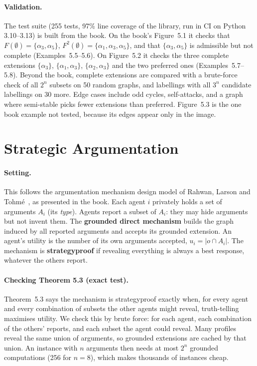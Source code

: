 \documentclass[11pt,a4paper]{article}
\newcommand{\A}[1]{\alpha_{#1}}
\begin{document}
\paragraph{Validation.} The test suite (255 tests, 97\% line coverage of the
library, run in CI on Python 3.10--3.13) is built from the book. On the
book's Figure~5.1 it checks that $F(\emptyset) = \{\A3,\A5\}$,
$F^2(\emptyset) = \{\A1,\A3,\A5\}$, and that $\{\A3,\A5\}$ is admissible but
not complete (Examples~5.5--5.6). On Figure~5.2 it checks the three complete
extensions $\{\A3\}$, $\{\A1,\A3\}$, $\{\A2,\A3\}$ and the two preferred ones
(Examples~5.7--5.8). Beyond the book, complete extensions are compared with a
brute-force check of all $2^n$ subsets on 50 random graphs, and labellings
with all $3^n$ candidate labellings on 30 more. Edge cases include odd
cycles, self-attacks, and a graph where semi-stable picks fewer extensions
than preferred. Figure~5.3 is the one book example not tested, because its
edges appear only in the image.

\section{Strategic Argumentation}

\paragraph{Setting.} This follows the argumentation mechanism design model
of Rahwan, Larson and Tohm\'e~\cite{rlt}, as presented in the book. Each agent $i$ privately holds a set of arguments $A_i$
(its \emph{type}). Agents report a subset of $A_i$: they may hide arguments
but not invent them. The \textbf{grounded direct mechanism} builds the graph
induced by all reported arguments and accepts its grounded extension. An
agent's utility is the number of its own arguments accepted,
$u_i = |o \cap A_i|$. The mechanism is \textbf{strategyproof} if revealing
everything is always a best response, whatever the others report.

\paragraph{Checking Theorem 5.3 (exact test).} Theorem~5.3 says the mechanism
is strategyproof exactly when, for every agent and every combination of
subsets the other agents might reveal, truth-telling maximises utility. We
check this by brute force: for each agent, each combination of the others'
reports, and each subset the agent could reveal. Many profiles reveal the same
union of arguments, so grounded extensions are cached by that union. An
instance with $n$ arguments then needs at most $2^n$ grounded computations
(256 for $n=8$), which makes thousands of instances cheap.
\end{document}
